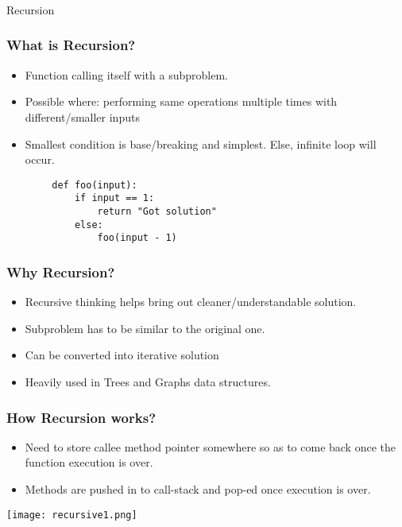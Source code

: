 \begin{frame}[fragile]\frametitle{}
\begin{center}
{\Large Recursion}
\end{center}

\end{frame}

\begin{frame}[fragile]
	\frametitle{What is Recursion?}
		\begin{itemize}
			\item Function calling itself with a subproblem.
			\item Possible where: performing same operations multiple times with different/smaller inputs
			\item Smallest condition is base/breaking and simplest. Else, infinite loop will occur.
		\end{itemize}
		
		\begin{lstlisting}
		def foo(input):
			if input == 1:
				return "Got solution"
			else:
				foo(input - 1)
		\end{lstlisting}
\end{frame}

\begin{frame}[fragile]
	\frametitle{Why Recursion?}
		\begin{itemize}
			\item Recursive thinking helps bring out cleaner/understandable solution.
			\item Subproblem has to be similar to the original one.
			\item Can be converted into iterative solution
			\item Heavily used in Trees and Graphs data structures.
		\end{itemize}
\end{frame}

\begin{frame}[fragile]
	\frametitle{How Recursion works?}
		\begin{itemize}
			\item Need to store callee method pointer somewhere so as to come back once the function execution is over.
			\item Methods are pushed in to call-stack and pop-ed once execution is over.
		\end{itemize}
		
\begin{center}
\texttt{[image: recursive1.png]}
\end{center}


\end{frame}

